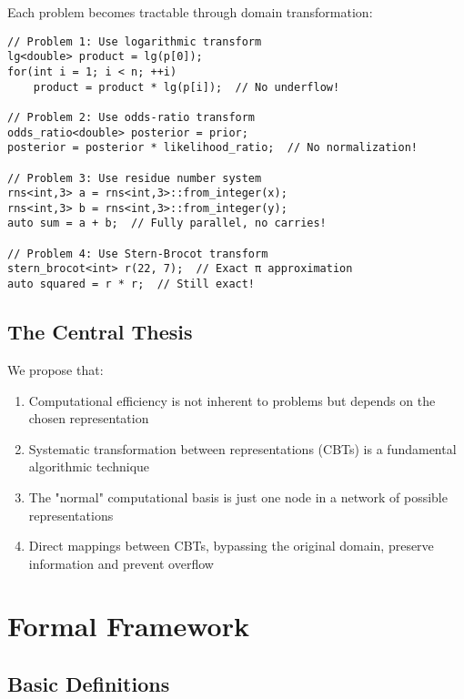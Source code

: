 \documentclass[12pt,a4paper]{article}
\theoremstyle{definition}
\begin{document}
Each problem becomes tractable through domain transformation:

\begin{lstlisting}[caption={Solutions through CBTs},label={lst:solutions}]
// Problem 1: Use logarithmic transform
lg<double> product = lg(p[0]);
for(int i = 1; i < n; ++i)
    product = product * lg(p[i]);  // No underflow!

// Problem 2: Use odds-ratio transform  
odds_ratio<double> posterior = prior;
posterior = posterior * likelihood_ratio;  // No normalization!

// Problem 3: Use residue number system
rns<int,3> a = rns<int,3>::from_integer(x);
rns<int,3> b = rns<int,3>::from_integer(y);
auto sum = a + b;  // Fully parallel, no carries!

// Problem 4: Use Stern-Brocot transform
stern_brocot<int> r(22, 7);  // Exact π approximation
auto squared = r * r;  // Still exact!
\end{lstlisting}

\subsection{The Central Thesis}

We propose that:
\begin{enumerate}
\item Computational efficiency is not inherent to problems but depends on the chosen representation
\item Systematic transformation between representations (CBTs) is a fundamental algorithmic technique
\item The "normal" computational basis is just one node in a network of possible representations
\item Direct mappings between CBTs, bypassing the original domain, preserve information and prevent overflow
\end{enumerate}

\section{Formal Framework}

\subsection{Basic Definitions}
\end{document}
